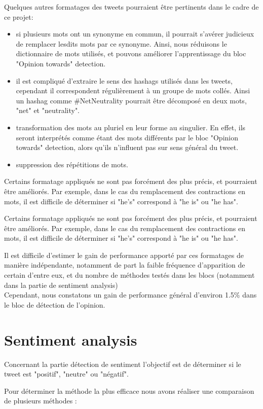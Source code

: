 \par Quelques autres formatages des tweets pourraient être pertinents dans le cadre de ce projet: \\
\begin{itemize}
  \item si plusieurs mots ont un synonyme en commun, il pourrait s'avérer judicieux de remplacer lesdits mots par ce synonyme. Ainsi, nous réduisons le dictionnaire de mots utilisés, et pouvons améliorer l'apprentissage du bloc "Opinion towards" detection.
  \item il est compliqué d'extraire le sens des hashags utilisés dans les tweets, cependant il correspondent régulièrement à un groupe de mots collés. Ainsi un hashag comme \#NetNeutrality pourrait être décomposé en deux mots, "net" et "neutrality".
  \item transformation des mots au pluriel en leur forme au singulier. En effet, ils seront interprétés comme étant des mots différents par le bloc "Opinion towards" detection, alors qu'ils n'influent pas sur sens général du tweet.
  \item suppression des répétitions de mots.
\end{itemize}
Certains formatage appliqués ne sont pas forcément des plus précis, et pourraient être améliorés. Par exemple, dans le cas du remplacement des contractions en mots, il est difficile de déterminer si "he's" correspond à "he is" ou "he has". 
 
\par Certains formatage appliqués ne sont pas forcément des plus précis, et pourraient être améliorés. Par exemple, dans le cas du remplacement des contractions en mots, il est difficile de déterminer si "he's" correspond à "he is" ou "he has". 
 
\par Il est difficile d'estimer le gain de performance apporté par ces formatages de manière indépendante, notamment de part la faible fréquence d'apparition de certain d'entre eux, et du nombre de méthodes testés dans les blocs (notamment dans la partie de sentiment analysis)\\ 
Cependant, nous constatons un gain de performance général d'environ 1.5\% dans le bloc de détection de l'opinion.  
 

\section{Sentiment analysis}

\par Concernant la partie détection de sentiment l'objectif est de déterminer si le tweet est "positif", "neutre" ou "négatif". 
\par Pour déterminer la méthode la plus efficace nous avons réaliser une comparaison de plusieurs méthodes :\\

